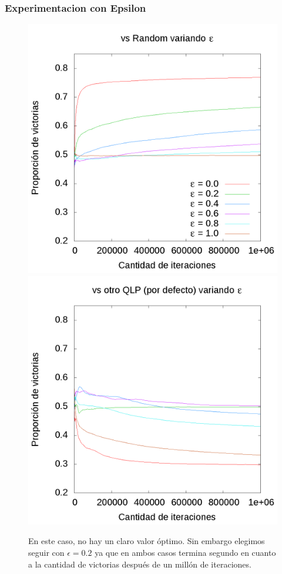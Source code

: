 \documentclass[10pt, a4paper]{article}
\begin{document}
\subsubsection{Experimentacion con Epsilon}
\begin{figure}[H]
  \begin{minipage}[c]{1\textwidth}
	\includegraphics[scale=0.2]{EpsilonR.png}
	\includegraphics[scale=0.2]{EpsilonQ.png}
	\caption{En este caso, no  hay un claro valor óptimo. Sin embargo elegimos seguir con $\epsilon=0.2$ ya que en ambos casos termina segundo en cuanto a la cantidad de victorias después de un millón de iteraciones.}
  \end{minipage}
\end{figure}
\end{document}
